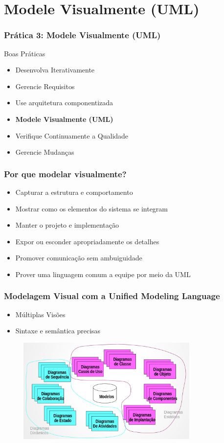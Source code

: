 \section{Modele Visualmente (UML)}
\begin{frame}
 \frametitle{Prática 3: Modele Visualmente (UML)}
 \begin{block}{Boas Práticas}
 \begin{itemize}
  \item Desenvolva Iterativamente
  \item Gerencie Requisitos
  \item Use arquitetura componentizada
  \item  \textbf{Modele Visualmente (UML)}
  \item  Verifique Continuamente a Qualidade
  \item Gerencie Mudanças  
 \end{itemize}
\end{block}
\end{frame}

\begin{frame}
 \frametitle{Por que modelar visualmente?}
 \begin{itemize}
  \item Capturar a estrutura e comportamento
  \item Mostrar como os elementos do sistema se integram
  \item Manter o projeto e implementação
  \item Expor ou esconder apropriadamente os detalhes
  \item Promover comunicação sem ambuiguidade
  \item Prover uma linguagem comum a equipe por meio da UML
 \end{itemize}
\end{frame}

\begin{frame}
 \frametitle{Modelagem Visual com a \textbf{U}nified \textbf{M}odeling \textbf{L}anguage}
 \begin{itemize}
  \item Múltiplas Visões
  \item Sintaxe e semântica precisas
 \end{itemize}
  \begin{figure}
   \centering
   \includegraphics[width = 0.8\textwidth]{figs/fig12.png}
  \end{figure}
\end{frame}

